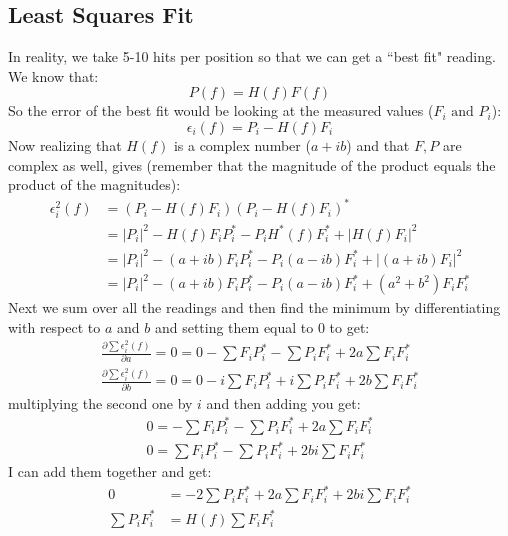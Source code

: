 \documentclass[11pt, oneside]{article}   	%
\begin{document}
\subsection{Least Squares Fit}
In reality, we take 5-10 hits per position so that we can get a ``best fit" reading.  We know that:
\begin{equation}
P(f) = H(f)F(f)
\end{equation}
So the error of the best fit would be looking at the measured values ($F_i \text{ and }P_i$):
\begin{equation}
\epsilon_i(f) = P_i - H(f)F_i
\end{equation}
Now realizing that $H(f)$ is a complex number ($a+ib$) and that $F,P$ are complex as well, gives (remember that the magnitude of the product equals the product of the magnitudes):
\begin{equation}
    \begin{split}
        \epsilon_i^2(f) &= (P_i - H(f)F_i)(P_i - H(f)F_i)^*\\
        &= |P_i|^2 -H(f)F_iP^*_i - P_iH^*(f)F^*_i + |H(f)F_i|^2 \\
        &= |P_i|^2 -(a+ib)F_iP^*_i - P_i(a-ib)F^*_i + |(a+ib)F_i|^2\\
        &= |P_i|^2 -(a+ib)F_iP^*_i - P_i(a-ib)F^*_i + (a^2+b^2)F_iF_i^*
    \end{split}
\end{equation}
Next we sum over all the readings and then find the minimum by differentiating with respect to $a$ and $b$ and setting them equal to 0 to get:
\begin{equation}
    \begin{split}
       \frac{\partial \sum \epsilon_i^2(f)}{\partial a} = 0= 0 -\sum F_iP^*_i - \sum P_iF^*_i + 2a\sum F_iF_i^*\\
       \frac{\partial \sum \epsilon_i^2(f)}{\partial b} = 0=0 -i\sum F_iP^*_i + i\sum P_iF^*_i  +2b\sum F_iF_i^*
    \end{split}
\end{equation}
multiplying the second one by $i$ and then adding you get:
\begin{equation}
    \begin{split}
       0=-\sum F_iP^*_i - \sum P_iF^*_i + 2a\sum F_iF_i^*\\
       0= \sum F_iP^*_i -\sum P_iF^*_i +2bi\sum F_iF_i^*
    \end{split}
\end{equation}
I can add them together and get:
\begin{equation}
    \begin{split}
       0 &= -2 \sum P_iF^*_i + 2a\sum F_iF_i^* +2bi\sum F_iF_i^*\\
        \sum P_iF^*_i &= H(f)\sum F_iF_i^*\\
    \end{split}
\end{equation}
\end{document}
